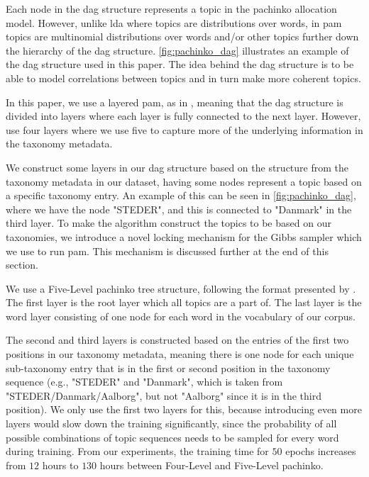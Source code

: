 Each node in the \gls{dag} structure represents a topic in the pachinko allocation model. 
However, unlike \gls{lda} where topics are distributions over words, in \gls{pam} topics are multinomial distributions over words and/or other topics further down the hierarchy of the \gls{dag} structure.
\autoref{fig:pachinko_dag} illustrates an example of the \gls{dag} structure used in this paper.
The idea behind the \gls{dag} structure is to be able to model correlations between topics and in turn make more coherent topics.
  
In this paper, we use a layered \gls{pam}, as in \cite{li2006pachinko}, meaning that the \gls{dag} structure is divided into layers where each layer is fully connected to the next layer.
However, \citet{li2006pachinko} use four layers where we use five to capture more of the underlying information in the taxonomy metadata.

We construct some layers in our \gls{dag} structure based on the structure from the taxonomy metadata in our dataset, having some nodes represent a topic based on a specific taxonomy entry.
An example of this can be seen in \autoref{fig:pachinko_dag}, where we have the node "STEDER", and this is connected to "Danmark" in the third layer.
To make the algorithm construct the topics to be based on our taxonomies, we introduce a novel locking mechanism for the Gibbs sampler which we use to run \gls{pam}.
This mechanism is discussed further at the end of this section.

We use a Five-Level pachinko tree structure, following the format presented by \citet{li2006pachinko}.
The first layer is the root layer which all topics are a part of.
The last layer is the word layer consisting of one node for each word in the vocabulary of our corpus.

The second and third layers is constructed based on the entries of the first two positions in our taxonomy metadata, meaning there is one node for each unique sub-taxonomy entry that is in the first or second position in the taxonomy sequence (e.g., "STEDER" and "Danmark", which is taken from "STEDER/Danmark/Aalborg", but not "Aalborg" since it is in the third position).
We only use the first two layers for this, because introducing even more layers would slow down the training significantly, since the probability of all possible combinations of topic sequences needs to be sampled for every word during training.
From our experiments, the training time for $50$ epochs increases from $12$ hours to $130$ hours between Four-Level and Five-Level pachinko.

